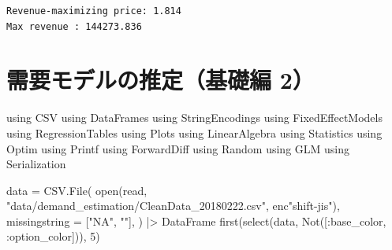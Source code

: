 \documentclass[
  letterpaper,
  DIV=11,
  numbers=noendperiod]{scrreprt}
\newenvironment{Shaded}{\begin{snugshade}}{\end{snugshade}}
\newcommand{\BuiltInTok}[1]{\textcolor[rgb]{0.00,0.23,0.31}{#1}}
\newcommand{\FloatTok}[1]{\textcolor[rgb]{0.68,0.00,0.00}{#1}}
\newcommand{\FunctionTok}[1]{\textcolor[rgb]{0.28,0.35,0.67}{#1}}
\newcommand{\ImportTok}[1]{\textcolor[rgb]{0.00,0.46,0.62}{#1}}
\newcommand{\NormalTok}[1]{\textcolor[rgb]{0.00,0.23,0.31}{#1}}
\newcommand{\OperatorTok}[1]{\textcolor[rgb]{0.37,0.37,0.37}{#1}}
\newcommand{\StringTok}[1]{\textcolor[rgb]{0.13,0.47,0.30}{#1}}
\begin{document}
\begin{verbatim}
Revenue-maximizing price: 1.814 
Max revenue : 144273.836
\end{verbatim}


\hypertarget{ux9700ux8981ux30e2ux30c7ux30ebux306eux63a8ux5b9aux57faux790eux7de8-2}{%
\chapter{需要モデルの推定（基礎編
2）}\label{ux9700ux8981ux30e2ux30c7ux30ebux306eux63a8ux5b9aux57faux790eux7de8-2}}

\begin{Shaded}
\begin{Highlighting}[]
\ImportTok{using} \BuiltInTok{CSV}
\ImportTok{using} \BuiltInTok{DataFrames}
\ImportTok{using} \BuiltInTok{StringEncodings}
\ImportTok{using} \BuiltInTok{FixedEffectModels}
\ImportTok{using} \BuiltInTok{RegressionTables}
\ImportTok{using} \BuiltInTok{Plots}
\ImportTok{using} \BuiltInTok{LinearAlgebra}
\ImportTok{using} \BuiltInTok{Statistics}
\ImportTok{using} \BuiltInTok{Optim}
\ImportTok{using} \BuiltInTok{Printf}
\ImportTok{using} \BuiltInTok{ForwardDiff}
\ImportTok{using} \BuiltInTok{Random}
\ImportTok{using} \BuiltInTok{GLM}
\ImportTok{using} \BuiltInTok{Serialization}
\end{Highlighting}
\end{Shaded}

\begin{Shaded}
\begin{Highlighting}[]
\NormalTok{data }\OperatorTok{=}\NormalTok{ CSV.}\FunctionTok{File}\NormalTok{(}
    \FunctionTok{open}\NormalTok{(read, }\StringTok{"data/demand\_estimation/CleanData\_20180222.csv"}\NormalTok{, enc}\StringTok{"shift{-}jis"}\NormalTok{),}
\NormalTok{    missingstring }\OperatorTok{=}\NormalTok{ [}\StringTok{"NA"}\NormalTok{, }\StringTok{""}\NormalTok{],}
\NormalTok{    ) }\OperatorTok{|\textgreater{}}\NormalTok{ DataFrame}
\FunctionTok{first}\NormalTok{(}\FunctionTok{select}\NormalTok{(data, }\FunctionTok{Not}\NormalTok{([}\OperatorTok{:}\NormalTok{base\_color, }\OperatorTok{:}\NormalTok{option\_color])), }\FloatTok{5}\NormalTok{)}
\end{Highlighting}
\end{Shaded}
\end{document}
